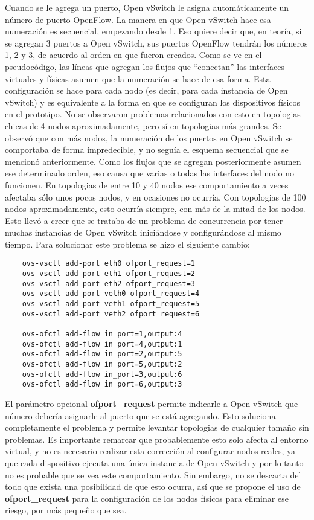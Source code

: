Cuando se le agrega un puerto, Open vSwitch le asigna automáticamente un número de puerto OpenFlow. La manera en que Open vSwitch hace esa numeración es secuencial, empezando desde 1. Eso quiere decir que, en teoría, si se agregan 3 puertos a Open vSwitch, sus puertos OpenFlow tendrán los números 1, 2 y 3, de acuerdo al orden en que fueron creados. Como se ve en el pseudocódigo, las líneas que agregan los flujos que \enquote{conectan} las interfaces virtuales y físicas asumen que la numeración se hace de esa forma. Esta configuración se hace para cada nodo (es decir, para cada instancia de Open vSwitch) y es equivalente a la forma en que se configuran los dispositivos físicos en el prototipo.
No se observaron problemas relacionados con esto en topologias chicas de 4 nodos aproximadamente, pero sí en topologias más grandes. Se observó que con más nodos, la numeración de los puertos en Open vSwitch se comportaba de forma impredecible, y no seguía el esquema secuencial que se mencionó anteriormente. Como los flujos que se agregan posteriormente asumen ese determinado orden, eso causa que varias o todas las interfaces del nodo no funcionen. En topologias de entre 10 y 40 nodos ese comportamiento a veces afectaba sólo unos pocos nodos, y en ocasiones no ocurría. Con topologias de 100 nodos aproximadamente, esto ocurría siempre, con más de la mitad de los nodos. Esto llevó a creer que se trataba de un problema de concurrencia por tener muchas instancias de Open vSwitch iniciándose y configurándose al mismo tiempo. Para solucionar este problema se hizo el siguiente cambio:
\begin{lstlisting}
	ovs-vsctl add-port eth0 ofport_request=1
	ovs-vsctl add-port eth1 ofport_request=2
	ovs-vsctl add-port eth2 ofport_request=3
	ovs-vsctl add-port veth0 ofport_request=4
	ovs-vsctl add-port veth1 ofport_request=5
	ovs-vsctl add-port veth2 ofport_request=6
	
	ovs-ofctl add-flow in_port=1,output:4
	ovs-ofctl add-flow in_port=4,output:1
	ovs-ofctl add-flow in_port=2,output:5
	ovs-ofctl add-flow in_port=5,output:2
	ovs-ofctl add-flow in_port=3,output:6
	ovs-ofctl add-flow in_port=6,output:3
\end{lstlisting}

El parámetro opcional \textbf{ofport\_request} permite indicarle a Open vSwitch que número debería asignarle al puerto que se está agregando. Esto soluciona completamente el problema y permite levantar topologias de cualquier tamaño sin problemas. Es importante remarcar que probablemente esto solo afecta al entorno virtual, y no es necesario realizar esta corrección al configurar nodos reales, ya que cada dispositivo ejecuta una única instancia de Open vSwitch y por lo tanto no es probable que se vea este comportamiento. Sin embargo, no se descarta del todo que exista una posibilidad de que esto ocurra, así que se propone el uso de \textbf{ofport\_request} para la configuración de los nodos físicos para eliminar ese riesgo, por más pequeño que sea.


